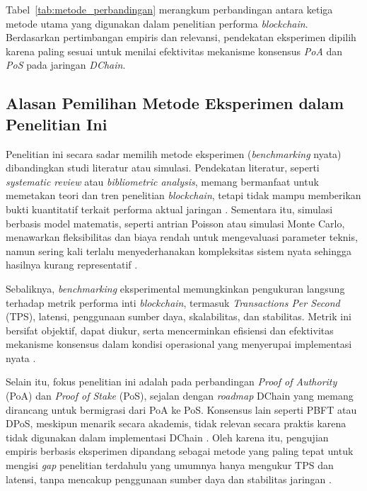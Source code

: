 Tabel~\ref{tab:metode_perbandingan} merangkum perbandingan antara ketiga metode utama yang digunakan dalam penelitian performa \textit{blockchain}. Berdasarkan pertimbangan empiris dan relevansi, pendekatan eksperimen dipilih karena paling sesuai untuk menilai efektivitas mekanisme konsensus \textit{PoA} dan \textit{PoS} pada jaringan \textit{DChain}.


\subsection{Alasan Pemilihan Metode Eksperimen dalam Penelitian Ini}

Penelitian ini secara sadar memilih metode eksperimen (\textit{benchmarking} nyata) dibandingkan studi literatur atau simulasi. Pendekatan literatur, seperti \textit{systematic review} atau \textit{bibliometric analysis}, memang bermanfaat untuk memetakan teori dan tren penelitian \textit{blockchain}, tetapi tidak mampu memberikan bukti kuantitatif terkait performa aktual jaringan \cite{fan2020, rico2023}. Sementara itu, simulasi berbasis model matematis, seperti antrian Poisson atau simulasi Monte Carlo, menawarkan fleksibilitas dan biaya rendah untuk mengevaluasi parameter teknis, namun sering kali terlalu menyederhanakan kompleksitas sistem nyata sehingga hasilnya kurang representatif \cite{zhou2020, shahsavari2022}.

Sebaliknya, \textit{benchmarking} eksperimental memungkinkan pengukuran langsung terhadap metrik performa inti \textit{blockchain}, termasuk \textit{Transactions Per Second} (TPS), latensi, penggunaan sumber daya, skalabilitas, dan stabilitas. Metrik ini bersifat objektif, dapat diukur, serta mencerminkan efisiensi dan efektivitas mekanisme konsensus dalam kondisi operasional yang menyerupai implementasi nyata \cite{dinh2017, zheng2019}.

Selain itu, fokus penelitian ini adalah pada perbandingan \textit{Proof of Authority} (PoA) dan \textit{Proof of Stake} (PoS), sejalan dengan \textit{roadmap} DChain yang memang dirancang untuk bermigrasi dari PoA ke PoS. Konsensus lain seperti PBFT atau DPoS, meskipun menarik secara akademis, tidak relevan secara praktis karena tidak digunakan dalam implementasi DChain \cite{lashkari2021, zhang2020}. Oleh karena itu, pengujian empiris berbasis eksperimen dipandang sebagai metode yang paling tepat untuk mengisi \textit{gap} penelitian terdahulu yang umumnya hanya mengukur TPS dan latensi, tanpa mencakup penggunaan sumber daya dan stabilitas jaringan \cite{wicaksono2022}.

